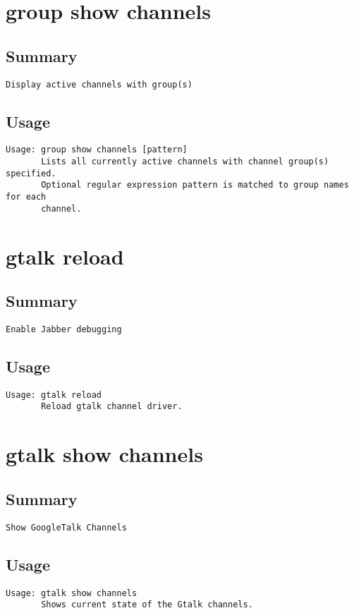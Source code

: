 \section{group show channels}
\subsection{Summary}
\begin{verbatim}
Display active channels with group(s)
\end{verbatim}
\subsection{Usage}
\begin{verbatim}
Usage: group show channels [pattern]
       Lists all currently active channels with channel group(s) specified.
       Optional regular expression pattern is matched to group names for each
       channel.

\end{verbatim}


\section{gtalk reload}
\subsection{Summary}
\begin{verbatim}
Enable Jabber debugging
\end{verbatim}
\subsection{Usage}
\begin{verbatim}
Usage: gtalk reload
       Reload gtalk channel driver.

\end{verbatim}


\section{gtalk show channels}
\subsection{Summary}
\begin{verbatim}
Show GoogleTalk Channels
\end{verbatim}
\subsection{Usage}
\begin{verbatim}
Usage: gtalk show channels
       Shows current state of the Gtalk channels.

\end{verbatim}


